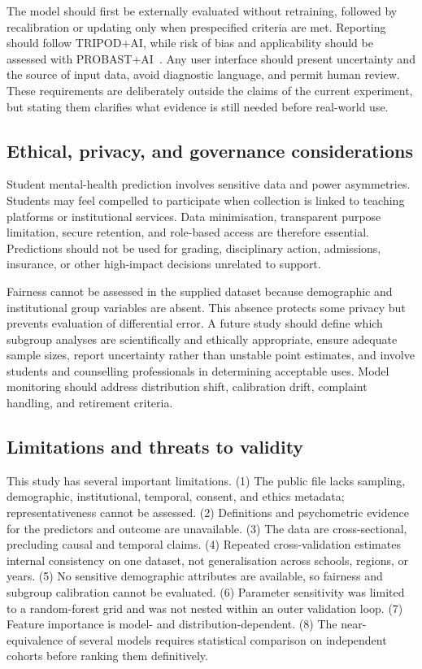 \documentclass[review]{elsarticle}
\begin{document}
The model should first be externally evaluated without retraining, followed by recalibration or updating only when prespecified criteria are met. Reporting should follow TRIPOD+AI, while risk of bias and applicability should be assessed with PROBAST+AI~\cite{collins2024,moons2025}. Any user interface should present uncertainty and the source of input data, avoid diagnostic language, and permit human review. These requirements are deliberately outside the claims of the current experiment, but stating them clarifies what evidence is still needed before real-world use.

\subsection{Ethical, privacy, and governance considerations}
Student mental-health prediction involves sensitive data and power asymmetries. Students may feel compelled to participate when collection is linked to teaching platforms or institutional services. Data minimisation, transparent purpose limitation, secure retention, and role-based access are therefore essential. Predictions should not be used for grading, disciplinary action, admissions, insurance, or other high-impact decisions unrelated to support.

Fairness cannot be assessed in the supplied dataset because demographic and institutional group variables are absent. This absence protects some privacy but prevents evaluation of differential error. A future study should define which subgroup analyses are scientifically and ethically appropriate, ensure adequate sample sizes, report uncertainty rather than unstable point estimates, and involve students and counselling professionals in determining acceptable uses. Model monitoring should address distribution shift, calibration drift, complaint handling, and retirement criteria.

\subsection{Limitations and threats to validity}
This study has several important limitations. (1) The public file lacks sampling, demographic, institutional, temporal, consent, and ethics metadata; representativeness cannot be assessed. (2) Definitions and psychometric evidence for the predictors and outcome are unavailable. (3) The data are cross-sectional, precluding causal and temporal claims. (4) Repeated cross-validation estimates internal consistency on one dataset, not generalisation across schools, regions, or years. (5) No sensitive demographic attributes are available, so fairness and subgroup calibration cannot be evaluated. (6) Parameter sensitivity was limited to a random-forest grid and was not nested within an outer validation loop. (7) Feature importance is model- and distribution-dependent. (8) The near-equivalence of several models requires statistical comparison on independent cohorts before ranking them definitively.
\end{document}
